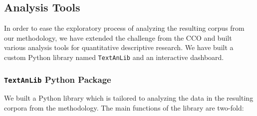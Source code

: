 \subsection{Analysis Tools}\label{sec_tools}
    In order to ease the exploratory process of analyzing the resulting corpus from our methodology, we have extended the challenge from the CCO and built various analysis tools for quantitative descriptive research. We have built a custom Python library named \texttt{TextAnLib} and an interactive dashboard.
    
    \subsubsection{\texttt{TextAnLib} Python Package}\label{sec_tool_pack}
        We built a Python library which is tailored to analyzing the data in the resulting corpora from the methodology. The main functions of the library are two-fold:
        
